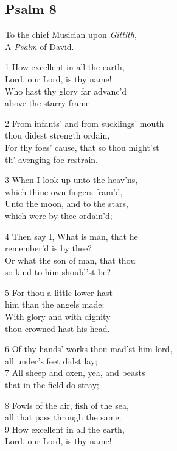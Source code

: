 \begin{multicols}{3}
\subsection*{Psalm 8 }


To the chief Musician upon \emph{Gittith},\\
A \emph{Psalm} of David.

1 How excellent in all the earth,\\
Lord, our Lord, is thy name!\\
Who hast thy glory far advanc’d\\
above the starry frame.

2 From infants’ and from sucklings’ mouth\\
thou didest strength ordain,\\
For thy foes’ cause, that so thou might’st\\
th’ avenging foe restrain.

3 When I look up unto the heav’ns,\\
which thine own fingers fram’d,\\
Unto the moon, and to the stars,\\
which were by thee ordain’d;

4 Then say I, What is man, that he\\
remember’d is by thee?\\
Or what the son of man, that thou\\
so kind to him should’st be?

5 For thou a little lower hast\\
him than the angels made;\\
With glory and with dignity\\
thou crowned hast his head.

6 Of thy hands’ works thou mad’st him lord,\\
all under’s feet didst lay;\\
7 All sheep and oxen, yea, and beasts\\
that in the field do stray;

8 Fowls of the air, fish of the sea,\\
all that pass through the same.\\
9 How excellent in all the earth,\\
Lord, our Lord, is thy name!

\begin{center}
\quad{}\quad{}
\end{center}


\end{multicols}
